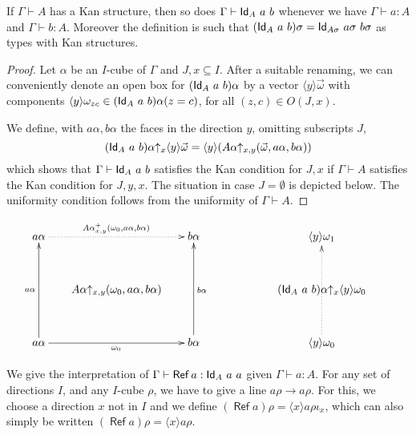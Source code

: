 \documentclass[a4paper,USenglish,draft]{lipics}
\DeclareMathOperator{\Ref}{\mathsf{Ref}}
\newcommand{\Id}{{\sf Id}}
\newcommand{\es}{\emptyset}
\newcommand{\rupx}[1]{#1{\uparrow_{x}}}
\newcommand{\rupxy}[1]{#1{\uparrow_{x,y}}}
\newcommand{\bind}[2]{{\langle}#1{\rangle}#2}
\begin{document}
\begin{theorem}
  If $\Gamma\vdash A$ has a Kan structure, then so does
  $\Gamma\vdash\Id_A~a~b$ whenever we have $\Gamma\vdash a:A$ and
  $\Gamma\vdash b:A$.  Moreover the definition is such that
  $(\Id_A~a~b) \sigma = \Id_{A \sigma}~a \sigma~b \sigma$ as types
  with Kan structures.
\end{theorem}

\begin{proof}
  Let $\alpha$ be an $I$-cube of $\Gamma$ and $J,x\subseteq I$. After
  a suitable renaming, we can conveniently denote an open box for
  $(\Id_A~a~b)\alpha$ by a vector $\bind{y}{\vec{\omega}}$ with
  components $\bind{y}{\omega_{zc}}\in(\Id_A~a~b)\alpha(z=c)$, for all
  $(z,c)\in O(J,x)$.

  We define, with $a\alpha,b\alpha$ the faces in the direction $y$,
  omitting subscripts $J$,
  $$
  \rupx{(\Id_A~a~b)\alpha}\bind{y}{\vec{\omega}} =
  \bind{y}{(\rupxy{A\alpha} (\vec{\omega},a\alpha,b\alpha))}
  $$
  which shows that $\Gamma\vdash \Id_A~a~b$ satisfies the Kan
  condition for $J,x$ if $\Gamma\vdash A$ satisfies the Kan condition for
  $J,y,x$. The situation in case $J=\es$ is depicted below.  The
  uniformity condition follows from the uniformity of $\Gamma\vdash A$.
\end{proof}
\[
\xymatrix@R=1.1cm@C=.6cm{
a\alpha\ar@{.>}[rr]^{A\alpha_{x,y}^+(\omega_0,a\alpha,b\alpha)}&      & b\alpha                                     &&&
\bind{y}{\omega_1}                                &          \\
                                      &\rupxy{A\alpha}(\omega_0,a\alpha,b\alpha)&                          &&&
                                      \rupx{(\Id_A~a~b)\alpha} \bind{y}{\omega_0}&                           \\
a\alpha\ar[rr]_{\omega_0}\ar[uu]^{a\alpha}&      & b\alpha\ar[uu]_{b\alpha}                                     &&&
\bind{y}{\omega_0}\ar@{.>}[uu]     &                             \\
}
\]

We give the interpretation of $\Gamma\vdash \Ref a:\Id_A~a~a$ given
$\Gamma\vdash a:A$. For any set of directions $I$, and any $I$-cube
$\rho$, we have to give a line $a\rho\to a\rho$. For this, we choose a
direction $x$ not in $I$ and we define $(\Ref a)\rho =
\bind{x}{a\rho\iota_x}$, which can also simply be written $(\Ref
a)\rho = \bind{x}{a\rho}$.
\end{document}

